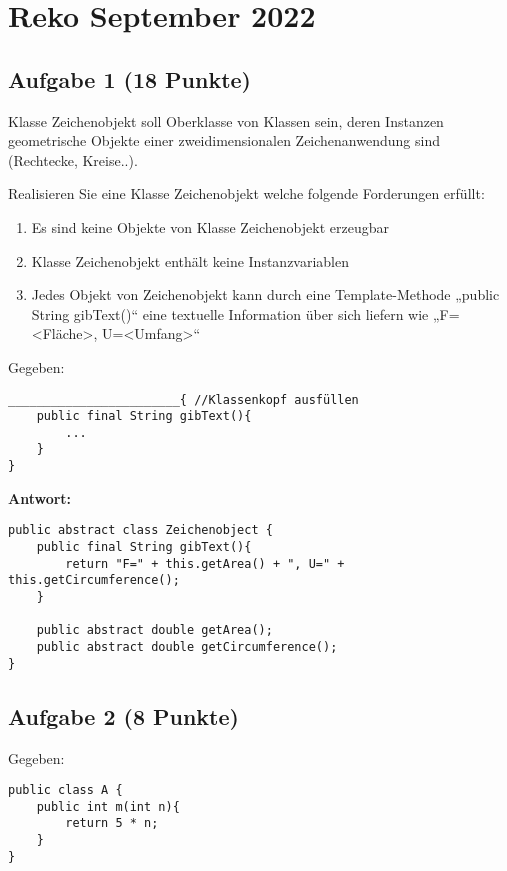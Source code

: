 \chapter{Reko September 2022}

\section{Aufgabe 1 (18 Punkte)}

Klasse Zeichenobjekt soll Oberklasse von Klassen sein, deren Instanzen
geometrische Objekte einer zweidimensionalen Zeichenanwendung sind (Rechtecke,
Kreise..).

Realisieren Sie eine Klasse Zeichenobjekt welche folgende Forderungen erfüllt:

\begin{enumerate}
    \item Es sind keine Objekte von Klasse Zeichenobjekt erzeugbar
    \item Klasse Zeichenobjekt enthält keine Instanzvariablen
    \item Jedes Objekt von Zeichenobjekt kann durch eine Template-Methode „public String
          gibText()“ eine textuelle Information über sich liefern wie „F=<Fläche>,
          U=<Umfang>“
\end{enumerate}

Gegeben:
\begin{lstlisting}
________________________{ //Klassenkopf ausfüllen
    public final String gibText(){
        ...
    }
}
\end{lstlisting}

\textbf{Antwort:}

\begin{lstlisting}
public abstract class Zeichenobject {
    public final String gibText(){
        return "F=" + this.getArea() + ", U=" + this.getCircumference();
    }

    public abstract double getArea();
    public abstract double getCircumference();
}
\end{lstlisting}

\section{Aufgabe 2 (8 Punkte)}

Gegeben:

\begin{lstlisting}
public class A {
    public int m(int n){
        return 5 * n;
    }
}
\end{lstlisting}

